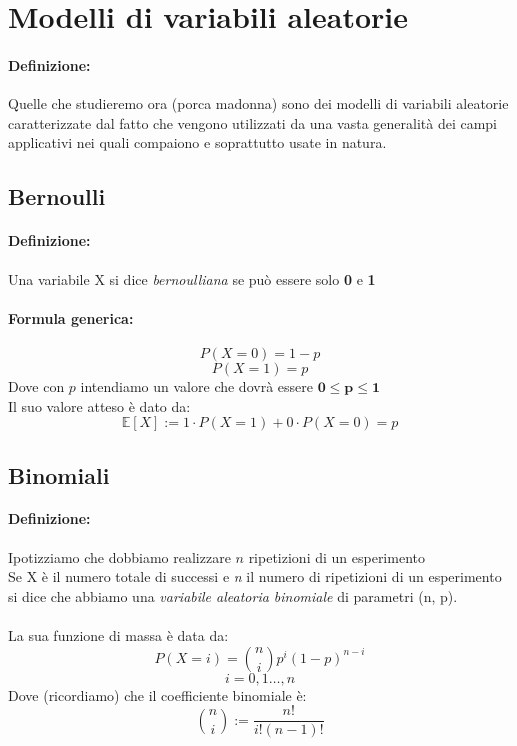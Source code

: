 \documentclass[]{article}
\newcommand{\ev}{\mathbb{E}[X]}
\renewcommand{\ev}[1]{\mathbb{E}[#1]}
\newcommand{\definizione}{\paragraph{Definizione:}}
\newcommand{\formula}{\paragraph{Formula generica:}}
\begin{document}
    \newpage
    \section{Modelli di variabili aleatorie}
    \definizione Quelle che studieremo ora (porca madonna) sono dei modelli di variabili aleatorie caratterizzate 
    dal fatto che vengono utilizzati da una vasta generalità dei campi applicativi nei quali compaiono e soprattutto usate in natura.
    \subsection{Bernoulli}
    \definizione Una variabile X si dice \textit{bernoulliana} se può essere solo \textbf{0} e \textbf{1}
    \formula 
    \[ P(X = 0) = 1 - p \]
    \[ P(X = 1) = p \]
    Dove con $p$ intendiamo un valore che dovrà essere $\boldsymbol{0 \leq p \leq 1}$ \\
    Il suo valore atteso è dato da:
    \[ \ev{X} := 1 \cdot P(X = 1) + 0 \cdot P(X = 0) = p \]


    \subsection{Binomiali}
    \definizione Ipotizziamo che dobbiamo realizzare $n$ ripetizioni di un esperimento \\
    Se X è il numero totale di successi e \textit{n} il numero di ripetizioni di un esperimento \\
    si dice che abbiamo una
    \textit{variabile aleatoria binomiale} di parametri (n, p). \\ \\
    La sua funzione di massa è data da:
    \[ P(X = i) = \binom{n}{i}p^i (1-p)^{n-i}  \]
    \[ i = 0,1 \ldots, n \]
    Dove (ricordiamo) che il coefficiente binomiale è:
    \[ \binom{n}{i} := \frac{n!}{i!(n-1)!} \] 
\end{document}
